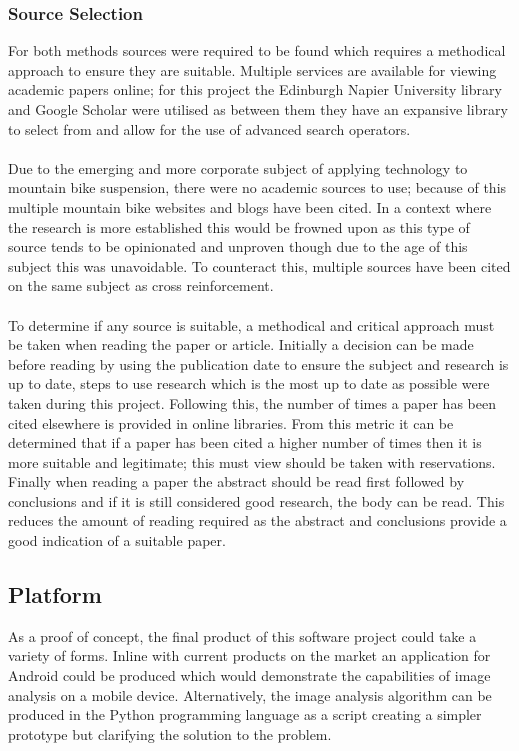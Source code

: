 	\subsubsection{Source Selection}
		For both methods sources were required to be found which requires a methodical approach to ensure they are suitable. Multiple services are available for viewing academic papers online; for this project the Edinburgh Napier University library and Google Scholar were utilised as between them they have an expansive library to select from and allow for the use of advanced search operators.
		\\\\
		Due to the emerging and more corporate subject of applying technology to mountain bike suspension, there were no academic sources to use; because of this multiple mountain bike websites and blogs have been cited. In a context where the research is more established this would be frowned upon as this type of source tends to be opinionated and unproven though due to the age of this subject this was unavoidable. To counteract this, multiple sources have been cited on the same subject as cross reinforcement.
		\\\\
		To determine if any source is suitable, a methodical and critical approach must be taken when reading the paper or article. Initially a decision can be made before reading by using the publication date to ensure the subject and research is up to date, steps to use research which is the most up to date as possible were taken during this project. Following this, the number of times a paper has been cited elsewhere is provided in online libraries. From this metric it can be determined that if a paper has been cited a higher number of times then it is more suitable and legitimate; this must view should be taken with reservations. Finally when reading a paper the abstract should be read first followed by conclusions and if it is still considered good research, the body can be read. This reduces the amount of reading required as the abstract and conclusions provide a good indication of a suitable paper.
\subsection{Platform}
	As a proof of concept, the final product of this software project could take a variety of forms. Inline with current products on the market an application for Android could be produced which would demonstrate the capabilities of image analysis on a mobile device. Alternatively, the image analysis algorithm can be produced in the Python programming language as a script creating a simpler prototype but clarifying the solution to the problem.
